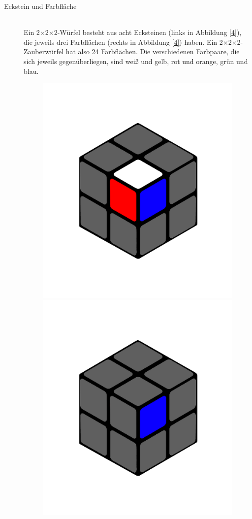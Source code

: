 \documentclass[12pt,a4paper, usenames, dvipsnames]{article}
\newcommand{\Ttwo}{2$\times$2$\times$2-}
\begin{document}
\begin{description}
\item[Eckstein und Farbfläche] \ \\
Ein \Ttwo Würfel besteht aus acht Ecksteinen (links in Abbildung \ref{4}), die jeweils drei Farbflächen (rechts in Abbildung \ref{4}) haben. Ein \Ttwo Zauberwürfel hat also 24 Farbflächen. Die verschiedenen Farbpaare, die sich jeweils gegenüberliegen, sind weiß und gelb, rot und orange, grün und blau.
\begin{figure}[h]
\centering
\includegraphics[scale=0.1]{2x2stein.png}
\includegraphics[scale=0.1]{2x2farbflaeche.png}

\end{figure}
\end{description}
\end{document}
